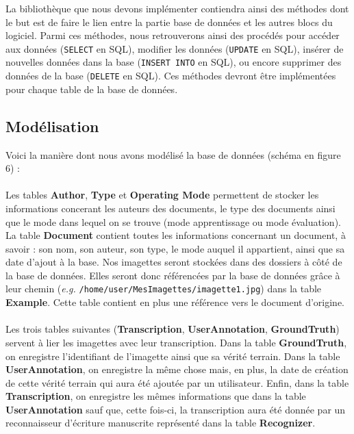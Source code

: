 La bibliothèque que nous devons implémenter contiendra ainsi des méthodes dont
le but est de faire le lien entre la partie base de données et les autres
blocs du logiciel. Parmi ces méthodes, nous retrouverons ainsi des procédés
pour accéder aux données (\texttt{SELECT} en SQL), modifier les données
(\texttt{UPDATE} en SQL), insérer de nouvelles données dans la base
(\texttt{INSERT INTO} en SQL), ou encore supprimer des données de la base
(\texttt{DELETE} en SQL). Ces méthodes devront être implémentées pour chaque
table de la base de données.

\subsection{Modélisation}

Voici la manière dont nous avons modélisé la base de données (schéma en figure
6) :

\paragraph{}
Les tables \textbf{Author}, \textbf{Type} et \textbf{Operating Mode} permettent
de stocker les informations concerant les auteurs des documents, le type des
documents ainsi que le mode dans lequel on se trouve (mode apprentissage ou
mode évaluation). La table \textbf{Document} contient toutes les informations
concernant un document, à savoir : son nom, son auteur, son type, le mode auquel
il appartient, ainsi que sa date d’ajout à la base.
Nos imagettes seront stockées dans des dossiers à côté de la base de données.
Elles seront donc référencées par la base de données grâce à leur chemin
(\textit{e.g.} \texttt{/home/user/MesImagettes/imagette1.jpg}) dans la table
\textbf{Example}. Cette table contient en plus une référence vers le document
d’origine.

\paragraph{}
Les trois tables suivantes (\textbf{Transcription}, \textbf{UserAnnotation},
\textbf{GroundTruth}) servent à lier les imagettes avec leur transcription.
Dans la table \textbf{GroundTruth}, on enregistre l’identifiant de l’imagette
ainsi que sa vérité terrain. Dans la table \textbf{UserAnnotation}, on
enregistre la même chose mais, en plus, la date de création de cette vérité
terrain qui aura été ajoutée par un utilisateur. Enfin, dans la table
\textbf{Transcription}, on enregistre les mêmes informations que dans la
table \textbf{UserAnnotation} sauf que, cette fois-ci, la transcription aura
été donnée par un reconnaisseur d’écriture manuscrite représenté dans la
table \textbf{Recognizer}.

